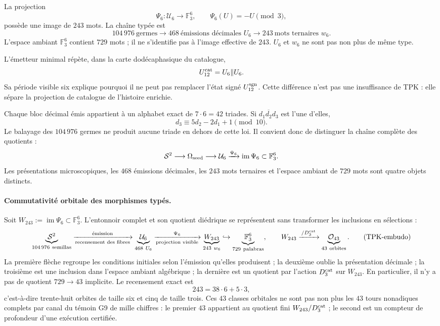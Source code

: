 La projection
\[
 \Psi_6:\mathcal U_6\longrightarrow\mathbb F_3^6,
 \qquad \Psi_6(U)=-U\pmod3,
\]
possède une image de \(243\) mots. La chaîne typée est
\[
 104\,976\ \text{germes}
 \longrightarrow468\ \text{émissions décimales }U_6
 \longrightarrow243\ \text{mots ternaires }w_6.
\]
L'espace ambiant \(\mathbb F_3^6\) contient \(729\) mots ; il ne s'identifie pas
à l'image effective de \(243\). \(U_6\) et \(w_6\) ne sont pas non plus de même
type.

L'émetteur minimal répète, dans la carte dodécaphasique du catalogue,
\[
 U_{12}^{\rm cat}=U_6\Vert U_6.
\]
Sa période visible six explique pourquoi il ne peut pas remplacer l'état signé
\(U_{12}^{\rm sgn}\). Cette différence n'est pas une insuffisance de TPK : elle sépare
la projection de catalogue de l'histoire enrichie.

Chaque bloc décimal émis appartient à un alphabet exact de
\(7\cdot6=42\) triades. Si \(\overline{d_1d_2d_3}\) est l'une d'elles,
\[
 \boxed{d_3\equiv5d_2-2d_1+1\pmod{10}.}
\]
Le balayage des \(104\,976\) germes ne produit aucune triade en dehors de cette
loi. Il convient donc de distinguer la chaîne complète des quotients :
\[
 \mathcal S^2
 \longrightarrow\Omega_{\rm seed}
 \longrightarrow\mathcal U_6
 \xrightarrow{\Psi_6}\operatorname{im}\Psi_6\subset\mathbb F_3^6.
\]
Les présentations microscopiques, les \(468\) émissions décimales, les
\(243\) mots ternaires et l'espace ambiant de \(729\) mots sont quatre
objets distincts.

\paragraph{Commutativité orbitale des morphismes typés.}
Soit
\(W_{243}:=\operatorname{im}\Psi_6\subset\mathbb F_3^6\). L'entonnoir
complet et son quotient diédrique se représentent sans transformer les inclusions en
sélections :
\[
 \underbrace{\mathcal S^2}_{104\,976\ \mathrm{semillas}}
 \xrightarrow[\text{recensement des fibres}]{\text{émission}}
 \underbrace{\mathcal U_6}_{468\ U_6}
 \xrightarrow[\text{projection visible}]{\Psi_6}
 \underbrace{W_{243}}_{243\ w_6}
 \hookrightarrow
 \underbrace{\mathbb F_3^6}_{729\ \mathrm{palabras}},
 \qquad
 W_{243}\xrightarrow{\,/D_3^{\rm cat}\,}
 \underbrace{\mathcal O_{43}}_{43\ \text{orbites}}.
 \tag{TPK-embudo}\label{eq:embudo-orbital-tipado-rev8}
\]
La première flèche regroupe les conditions initiales selon l'émission qu'elles produisent ;
la deuxième oublie la présentation décimale ; la troisième est une inclusion dans
l'espace ambiant algébrique ; la dernière est un quotient par l'action
\(D_3^{\rm cat}\) sur \(W_{243}\). En particulier, il n'y a pas de quotient
\(729\to43\) implicite. Le recensement exact est
\[
 243=38\cdot6+5\cdot3,
\]
c'est-à-dire trente-huit orbites de taille six et cinq de taille trois.
Ces \(43\) classes orbitales ne sont pas non plus les \(43\) tours nonadiques
complets par canal du témoin G9 de mille chiffres : le premier \(43\) appartient
au quotient fini \(W_{243}/D_3^{\rm cat}\) ; le second est un compteur de
profondeur d'une exécution certifiée.

